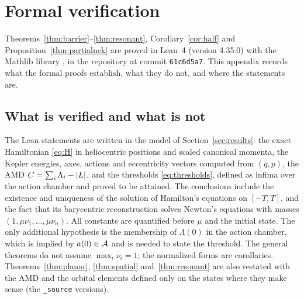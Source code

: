 \section{Formal verification}\label{app:formal}

Theorems~\ref{thm:barrier}--\ref{thm:resonant}, Corollary~\ref{cor:half} and Proposition~\ref{thm:partialnek} are
proved in Lean~4 \cite{Lean4} (version 4.35.0) with the Mathlib library \cite{Mathlib}, in the repository
\cite{KAMrepo} at commit \texttt{61c6d5a7}. This appendix records what the formal proofs establish, what they do
not, and where the statements are.

\subsection{What is verified and what is not}

The Lean statements are written in the model of Section~\ref{sec:results}: the exact Hamiltonian \eqref{eq:H}
in heliocentric positions and scaled canonical momenta, the Kepler energies, axes, actions and eccentricity
vectors computed from $(q,p)$, the AMD $C=\sum_i\Lambda_i-\lvert L\rvert$, and the thresholds \eqref{eq:thresholds},
defined as infima over the action chamber and proved to be attained. The conclusions include the existence and
uniqueness of the solution of Hamilton's equations on $[-T,T]$, and the fact that its barycentric reconstruction
solves Newton's equations with masses $(1,\mu\nu_1,\dots,\mu\nu_n)$. All constants are quantified before $\mu$
and the initial state. The only additional hypothesis is the membership of $\Lambda(0)$
in the action chamber, which is implied by $a(0)\in\mathcal{A}$ and is needed to state the threshold. The general
theorems do not assume $\max_i\nu_i=1$; the normalized forms are corollaries. Theorems~\ref{thm:planar},
\ref{thm:spatial} and~\ref{thm:resonant} are also restated with the AMD and the orbital elements defined only on
the states where they make sense (the \texttt{\_source} versions).


